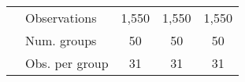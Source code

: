 \begin{tabular}{l|lccc}
& Observations & 1,550 & 1,550 & 1,550 \\ 

& Num. groups  & 50 & 50 & 50 \\ 

& Obs. per group  &31&31&31\\ 
\end{tabular} 
